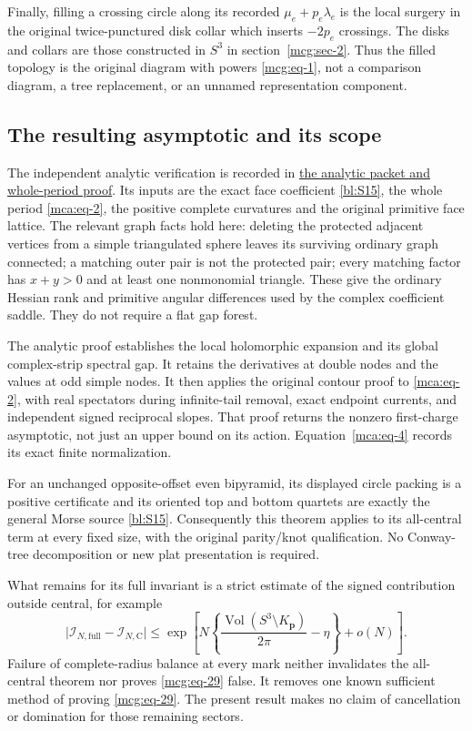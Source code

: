 Finally, filling a crossing circle along its recorded
\(\mu_e+p_e\lambda_e\) is the local surgery in the original
twice-punctured disk collar which inserts \(-2p_e\) crossings. The disks
and collars are those constructed in \(S^3\) in
section~\ref{mcg:sec-2}. Thus the filled topology is the
original diagram with powers \eqref{mcg:eq-1}, not a comparison diagram,
a tree replacement, or an unnamed representation component.

\subsection{The resulting asymptotic and its scope}\label{mcg:sec-8}

The independent analytic verification is recorded in
\hyperref[mca:unit]{the
analytic packet and whole-period proof}. Its inputs are the exact face coefficient \eqref{bl:S15},
the whole period \eqref{mca:eq-2}, the positive complete curvatures and the
original primitive face lattice. The relevant graph facts hold here:
deleting the protected adjacent vertices from a simple triangulated
sphere leaves its surviving ordinary graph connected; a matching outer
pair is not the protected pair; every matching factor has \(x+y>0\) and
at least one nonmonomial triangle. These give the ordinary Hessian rank
and primitive angular differences used by the complex coefficient
saddle. They do not require a flat gap forest.

The analytic proof establishes the local holomorphic expansion and
its global complex-strip spectral gap. It retains the derivatives at
double nodes and the values at odd simple nodes. It
then applies the original contour proof to \eqref{mca:eq-2}, with real
spectators during infinite-tail removal, exact endpoint currents, and
independent signed reciprocal slopes. That proof returns the nonzero
first-charge asymptotic, not just an upper bound on its action.
Equation~\eqref{mca:eq-4} records its exact finite normalization.

For an unchanged opposite-offset even bipyramid, its displayed circle
packing is a positive certificate and its oriented top and bottom
quartets are exactly the general Morse source \eqref{bl:S15}.
Consequently this theorem applies to its all-central term at every fixed
size, with the original parity/knot qualification. No Conway-tree
decomposition or new plat presentation is required.

What remains for its full invariant is a strict estimate of the
signed contribution outside central, for example \begin{equation}\label{mcg:eq-29}
\bigl|\mathcal I_{N,\mathrm{full}}
            -\mathcal I_{N,\mathrm C}\bigr|
 \le \exp\!\left[
       N\left\{\frac{\operatorname{Vol}(S^3\setminus K_{\boldsymbol p})}
                       {2\pi}-\eta\right\}+o(N)\right].
\end{equation} Failure of complete-radius balance at every mark neither invalidates
the all-central theorem nor proves \eqref{mcg:eq-29} false. It removes one
known sufficient method of proving \eqref{mcg:eq-29}. The present result
makes no claim of cancellation or domination for those remaining
sectors.

